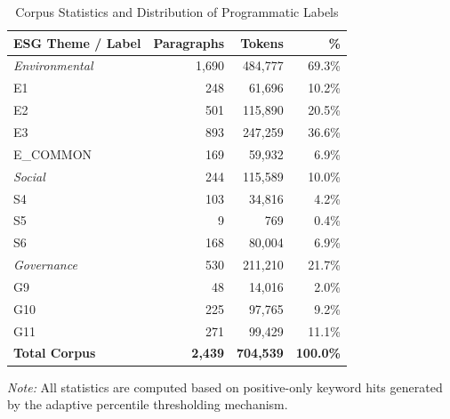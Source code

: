 \begin{table}[t]
\centering
\caption{Corpus Statistics and Distribution of Programmatic Labels}
\label{tab:dataset_statistics}
\scriptsize
\setlength{\tabcolsep}{2pt}
\renewcommand{\arraystretch}{1.08}
\color{black} %
\begin{tabularx}{\columnwidth}{@{}>{\raggedright\arraybackslash}X r r r@{}}
\hline
\textbf{ESG Theme / Label} & \textbf{Paragraphs} & \textbf{Tokens} & \textbf{\%} \\
\hline
\textit{Environmental} & 1,690 & 484,777 & 69.3\% \\
\quad E1 & 248 & 61,696 & 10.2\% \\
\quad E2 & 501 & 115,890 & 20.5\% \\
\quad E3 & 893 & 247,259 & 36.6\% \\
\quad E\_COMMON & 169 & 59,932 & 6.9\% \\

\hline
\textit{Social} & 244 & 115,589 & 10.0\% \\
\quad S4 & 103 & 34,816 & 4.2\% \\
\quad S5 & 9 & 769 & 0.4\% \\
\quad S6 & 168 & 80,004 & 6.9\% \\
\hline
\textit{Governance} & 530 & 211,210 & 21.7\% \\
\quad G9 & 48 & 14,016 & 2.0\% \\
\quad G10 & 225 & 97,765 & 9.2\% \\
\quad G11 & 271 & 99,429 & 11.1\% \\
\hline
\textbf{Total Corpus} & \textbf{2,439} & \textbf{704,539} & \textbf{100.0\%} \\
\hline
\end{tabularx}
\vbox{\vspace{1ex}\small \textit{Note:} All statistics are computed based on positive-only keyword hits generated by the adaptive percentile thresholding mechanism.}
\end{table}